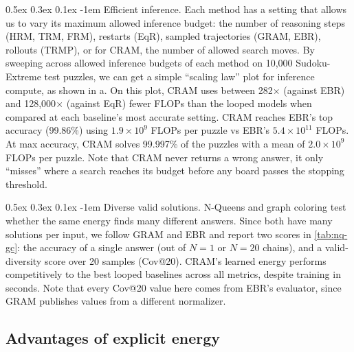 \documentclass{article}
\makeatletter
\newcommand{\CRAM}{\textsc{CRAM}}
\renewcommand{\paragraph}{%
  \@startsection{paragraph}{4}{\z@}%
                {0.5ex \@plus 0.3ex \@minus 0.1ex}%
                {-1em}%
                {\normalsize\bf}%
}
\makeatother
\begin{document}
\paragraph{Efficient inference.}
Each method has a setting that allows us to vary its maximum allowed inference budget: the number of reasoning steps (HRM, TRM, FRM), restarts (EqR), sampled trajectories (GRAM, EBR), rollouts (TRMP), or for \CRAM{}, the number of allowed search moves.
By sweeping across allowed inference budgets of each method on 10,000 Sudoku-Extreme test puzzles, we can get a simple ``scaling law'' plot for inference compute, as shown in a.
On this plot, \CRAM{} uses between 282${\times}$ (against EBR) and 128,000${\times}$ (against EqR) fewer FLOPs than the looped models when compared at each baseline's most accurate setting.
\CRAM{} reaches EBR's top accuracy (99.86\%) using $1.9\times10^9$ FLOPs per puzzle vs EBR's $5.4\times 10^{11}$ FLOPs.
At max accuracy, \CRAM{} solves 99.997\% of the puzzles with a mean of $2.0\times10^9$ FLOPs per puzzle.
Note that \CRAM{} never returns a wrong answer, it only ``misses'' where a search reaches its budget before any board passes the stopping threshold.

\paragraph{Diverse valid solutions.}
N-Queens and graph coloring test whether the same energy finds many different answers. 
Since both have many solutions per input, we follow GRAM and EBR \citep{gram2026,ebr2026} and report two scores in \cref{tab:nq-gc}: the accuracy of a single answer (out of $N=1$ or $N=20$ chains), and a valid-diversity score over 20 samples (Cov@20). 
%
\CRAM{}'s learned energy performs competitively to the best looped baselines across all metrics, despite training in seconds. 
Note that every Cov@20 value here comes from EBR's evaluator, since GRAM publishes values from a different normalizer.

\subsection{Advantages of explicit energy}
\label{sec:energy-properties}
\end{document}
